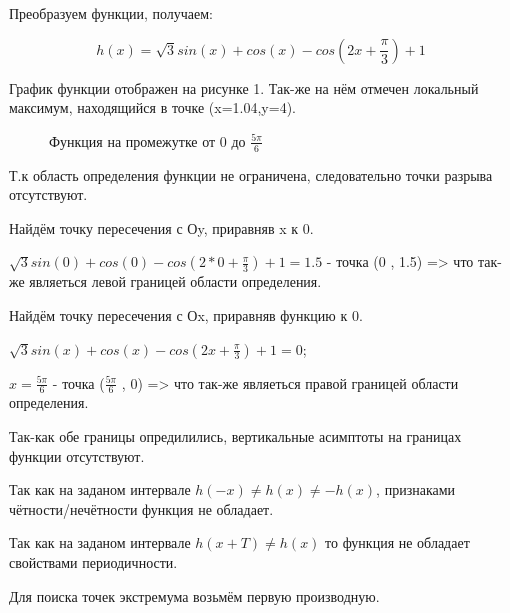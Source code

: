\documentclass[russian,utf8,nocolumnxxxi,nocolumnxxxii]{eskdtext}
\begin{document}
\begin{enumerate}
\begin{enumerate}
     \end{enumerate}
        
         Преобразуем функции, получаем:
    
    $$h(x) = \sqrt{3}sin(x)+cos(x)-cos(2x+\frac{\pi}{3})+1$$
    
    График функции отображен на рисунке 1. Так-же на нём отмечен локальный максимум, находящийся в точке (x=1.04,y=4).
    
     \begin{figure}[h]
      \centering
      \caption{Функция на промежутке от 0 до $\frac{5\pi}{6}$}
    
   \end{figure}
    
    Т.к область определения функции не ограничена, следовательно точки разрыва отсутствуют.
        
        Найдём точку пересечения с Оy, приравняв x к 0.
        
        $\sqrt{3}sin(0)+cos(0)-cos(2*0+\frac{\pi}{3})+1=1.5$ - точка (0 , 1.5) => что так-же являеться левой границей области определения.
        
        Найдём точку пересечения с Оx, приравняв функцию к 0.
        
        $\sqrt{3}sin(x)+cos(x)-cos(2x+\frac{\pi}{3})+1=0$;
        
        $x=\frac{5\pi}{6}$ - точка ($\frac{5\pi}{6}$ , 0) => что так-же являеться правой границей области определения.
        
        Так-как обе границы опредилились, вертикальные асимптоты на границах функции отсутствуют.
        
        Так как на заданом интервале $h(-x) \ne h(x) \ne -h(x)$, признаками чётности/нечётности функция не обладает.
        
        Так как на заданом интервале $h(x+T) \ne h(x)$ то функция не обладает свойствами периодичности.
        
        Для поиска точек экстремума возьмём первую производную.
        

\end{enumerate}
\end{document}
